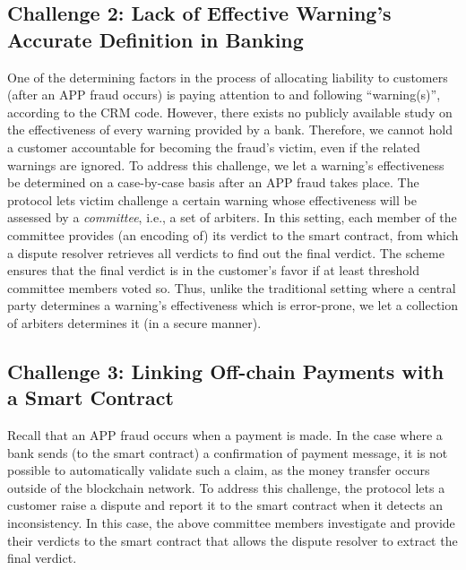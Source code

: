 \vspace{-3mm}
\subsection{Challenge 2: Lack of Effective Warning's Accurate Definition in Banking}\label{sec::Lack-of-Effective-Warning-Definition}

One of the determining  factors in the process of allocating liability to  customers (after an APP fraud occurs) is paying attention to and following ``warning(s)'', according to the CRM code. However, there exists  no  publicly available study  on the  effectiveness of every warning  provided by  a bank. Therefore, we cannot hold a customer accountable for becoming the fraud's victim,  even if the related warnings are ignored.    To address this challenge, we let a warning's effectiveness be determined on a case-by-case basis after an APP fraud takes place. The protocol lets  victim   challenge a certain warning whose effectiveness will be assessed by a \emph{committee}, i.e., a  set of arbiters. In this setting, each member of the  committee provides (an encoding of) its verdict to the smart contract, from which a dispute resolver retrieves all verdicts to find out the final verdict. The scheme ensures that the final verdict is  in the customer's favor if at least threshold  committee members voted so. Thus, unlike the traditional setting where a central party determines a warning's effectiveness which is error-prone, we let a collection of arbiters   determines it (in a secure manner).



\vspace{-3mm}
\subsection{Challenge 3: Linking Off-chain Payments with a Smart Contract}\label{sec::Linking Off-chain-Payments-with-contract}
 Recall that an APP fraud occurs when a payment is made. In the case where a  bank  sends  (to the smart contract) a confirmation of payment message, it is not possible to automatically validate such a claim, as the money  transfer occurs  outside of the blockchain network. To address this challenge, the protocol lets a customer raise a dispute and report it to the smart contract when it detects an inconsistency. In this case, the above committee members investigate and provide their  verdicts to the smart contract that allows the dispute resolver to extract the final verdict. 


